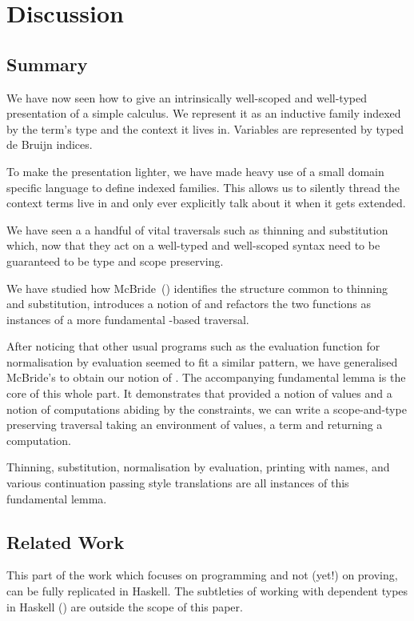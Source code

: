 \chapter{Discussion}
\label{chapter:program-conclusion}

\section{Summary}

We have now seen how to give an intrinsically well-scoped and well-typed
presentation of a simple calculus. We represent it as an inductive family
indexed by the term's type and the context it lives in. Variables are
represented by typed de Bruijn indices.

To make the presentation lighter, we have made heavy use of a small domain
specific language to define indexed families. This allows us to silently
thread the context terms live in and only ever explicitly talk about it
when it gets extended.

We have seen a a handful of vital traversals such as thinning and substitution
which, now that they act on a well-typed and well-scoped syntax need to be
guaranteed to be type and scope preserving.

We have studied how McBride~(\citeyear{mcbride2005type}) identifies the
structure common to thinning and substitution, introduces a notion of 
and refactors the two functions as instances of a more fundamental -based
traversal.

After noticing that other usual programs such as the evaluation function for
normalisation by evaluation seemed to fit a similar pattern, we have generalised
McBride's  to obtain our notion of . The accompanying
fundamental lemma is the core of this whole part. It demonstrates that
provided a notion of values and a notion of computations abiding by the
 constraints, we can write a scope-and-type preserving traversal
taking an environment of values, a term and returning a computation.

Thinning, substitution, normalisation by evaluation, printing with names, and
various continuation passing style translations are all instances of this
fundamental lemma.

\section{Related Work}

This part of the work which focuses on programming and not (yet!) on proving,
can be fully replicated in Haskell.
The subtleties of working with dependent types in Haskell (\cite{lindley2014hasochism})
are outside the scope of this paper.

